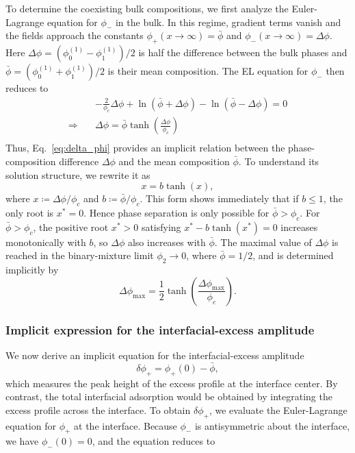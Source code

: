 \documentclass[12pt]{article}
\begin{document}
To determine the coexisting bulk compositions, we first analyze the Euler-Lagrange equation for \(\phi_-\) in the bulk. In this regime, gradient terms vanish and the fields approach the constants \(\phi_+(x\rightarrow \infty) = \bar\phi\) and \(\phi_-(x\rightarrow \infty) = \Delta \phi\).
Here \(\Delta \phi = (\phi_0^{(1)}-\phi_1^{(1)})/2\) is half the difference between the bulk phases and \(\bar\phi = (\phi_0^{(1)}+\phi_1^{(1)})/2\) is their mean composition.
The EL equation for \(\phi_-\) then reduces to
\begin{equation}
\begin{aligned}
    &-\frac{2}{\phi_c}\Delta \phi + \ln(\bar\phi + \Delta\phi)-\ln(\bar\phi - \Delta\phi) = 0\\
    \Rightarrow\quad&\Delta \phi = \bar\phi\tanh\left(\frac{\Delta\phi}{\phi_c}\right)\\
\end{aligned}
\label{eq:delta_phi}
\end{equation}
Thus, Eq.~\eqref{eq:delta_phi} provides an implicit relation between the phase-composition difference \(\Delta\phi\) and the mean composition \(\bar\phi\). To understand its solution structure, we rewrite it as
\[
x = b \tanh(x),
\]
where $x\coloneq\Delta \phi / \phi_c$ and $b\coloneq\bar\phi/\phi_c$.
This form shows immediately that if \(b\leq 1\), the only root is \(x^*=0\). Hence phase separation is only possible for $\bar\phi > \phi_c$. For \(\bar\phi>\phi_c\), the positive root \(x^*>0\) satisfying \(x^*-b\tanh(x^*)=0\) increases monotonically with \(b\), so \(\Delta \phi\) also increases with \(\bar\phi\). The maximal value of \(\Delta \phi\) is reached in the binary-mixture limit \(\phi_2 \to 0\), where \(\bar\phi = 1/2\), and is determined implicitly by
\[
\Delta \phi_{\max} = \frac{1}{2}\tanh\left(\frac{\Delta\phi_{\max}}{\phi_c}\right).
\]

\subsubsection{Implicit expression for the interfacial-excess amplitude}
We now derive an implicit equation for the interfacial-excess amplitude
\[
\delta\phi_+ = \phi_+(0) - \bar\phi,
\]
which measures the peak height of the excess profile at the interface center. By contrast, the total interfacial adsorption would be obtained by integrating the excess profile across the interface.
To obtain \(\delta\phi_+\), we evaluate the Euler-Lagrange equation for \(\phi_+\) at the interface. Because \(\phi_-\) is antisymmetric about the interface, we have \(\phi_-(0)=0\), and the equation reduces to
\end{document}
